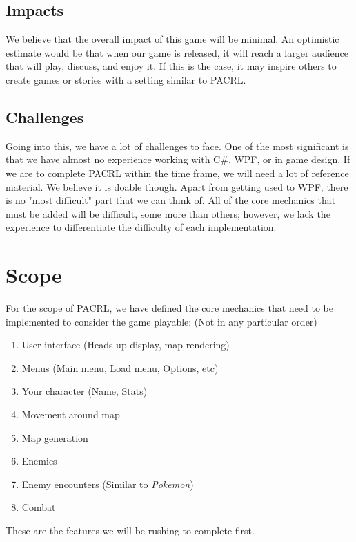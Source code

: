 \documentclass[10pt,conference,onecolumn,compsoc]{IEEEtran}
\begin{document}
\subsection{Impacts}
We believe that the overall impact of this game will be minimal. An optimistic estimate would be that when our game is released, it will reach a larger audience that will play, discuss, and enjoy it. If this is the case, it may inspire others to create games or stories with a setting similar to PACRL.

\subsection{Challenges}
Going into this, we have a lot of challenges to face. One of the most significant is that we have almost no experience working with C\#, WPF, or in game design. If we are to complete PACRL within the time frame, we will need a lot of reference material. We believe it is doable though. 
Apart from getting used to WPF, there is no "most difficult" part that we can think of. All of the core mechanics that must be added will be difficult, some more than others; however, we lack the experience to differentiate the difficulty of each implementation. 



\section{Scope}
For the scope of PACRL, we have defined the core mechanics that need to be implemented to consider the game playable: (Not in any particular order)
\begin{enumerate}
\item User interface (Heads up display, map rendering)
\item Menus (Main menu, Load menu, Options, etc)
\item Your character (Name, Stats)
\item Movement around map
\item Map generation
\item Enemies
\item Enemy encounters (Similar to \emph{Pokemon})
\item Combat
\end{enumerate}

These are the features we will be rushing to complete first. 
\end{document}
